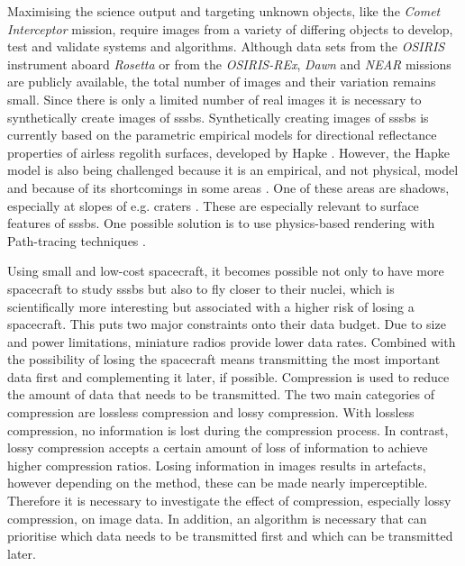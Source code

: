 Maximising the science output and targeting unknown objects, like the \textit{Comet Interceptor} mission, require images from a variety of differing objects to develop, test and validate systems and algorithms. Although data sets from the \textit{OSIRIS} instrument aboard \textit{Rosetta} \cite{osirisArchive} or from the \textit{OSIRIS-REx}, \textit{Dawn} and \textit{NEAR} missions \cite{palmer2014small} are publicly available, the total number of images and their variation remains small. Since there is only a limited number of real images it is necessary to synthetically create images of \gls{sssb}s. Synthetically creating images of \gls{sssb}s is currently based on the parametric empirical models for directional reflectance properties of airless regolith surfaces, developed by Hapke \cite{hapke1981bidirectional, hapke1981bidirectional2, hapke1984bidirectional, hapke1986bidirectional, hapke2002bidirectional, hapke2008bidirectional, hapke2012bidirectional}. However, the Hapke model is also being challenged because it is an empirical, and not physical, model and because of its shortcomings in some areas \cite{shkuratov2012critical}. One of these areas are shadows, especially at slopes of e.g. craters \cite{shkuratov2012critical}. These are especially relevant to surface features of \gls{sssb}s. One possible solution is to use physics-based rendering with Path-tracing techniques \cite{shkuratov2012critical, lafortune1996mathematical}.

Using small and low-cost spacecraft, it becomes possible not only to have more spacecraft to study \gls{sssb}s but also to fly closer to their nuclei, which is scientifically more interesting but associated with a higher risk of losing a spacecraft. This puts two major constraints onto their data budget. Due to size and power limitations, miniature radios provide lower data rates. Combined with the possibility of losing the spacecraft means transmitting the most important data first and complementing it later, if possible. Compression is used to reduce the amount of data that needs to be transmitted. The two main categories of compression are lossless compression and lossy compression. With lossless compression, no information is lost during the compression process. In contrast, lossy compression accepts a certain amount of loss of information to achieve higher compression ratios. Losing information in images results in artefacts, however depending on the method, these can be made nearly imperceptible. Therefore it is necessary to investigate the effect of compression, especially lossy compression, on image data. In addition, an algorithm is necessary that can prioritise which data needs to be transmitted first and which can be transmitted later.

